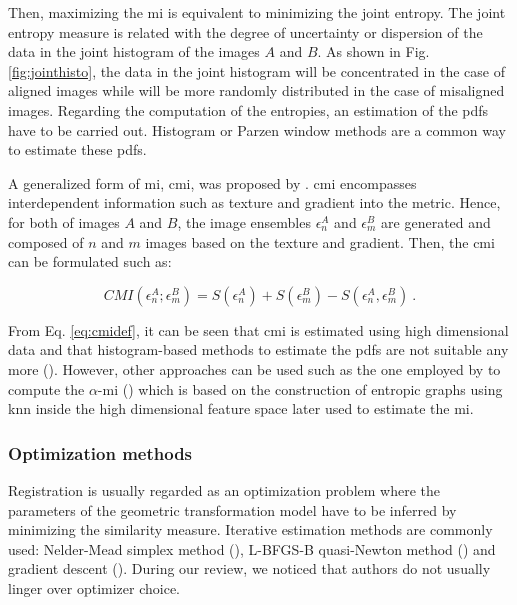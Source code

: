 Then, maximizing the \ac{mi} is equivalent to minimizing the joint entropy. The joint entropy measure is related with the degree of uncertainty or dispersion of the data in the joint histogram of the images $A$ and $B$. As shown in Fig. \ref{fig:jointhisto}, the data in the joint histogram will be concentrated in the case of aligned images while will be more randomly distributed in the case of misaligned images. Regarding the computation of the entropies, an estimation of the \acp{pdf} have to be carried out. Histogram or Parzen window methods are a common way to estimate these \acp{pdf}.

A generalized form of \ac{mi}, \ac{cmi}, was proposed by \cite{Chappelow2011}. \ac{cmi} encompasses interdependent information such as texture and gradient into the metric. Hence, for both of images $A$ and $B$, the image ensembles $\epsilon^{A}_n$ and $\epsilon^{B}_m$ are generated and composed of $n$ and $m$ images based on the texture and gradient. Then, the \ac{cmi} can be formulated such as:

\begin{equation}
	CMI(\epsilon^{A}_n;\epsilon^{B}_m) = S(\epsilon^{A}_n) + S(\epsilon^{B}_m) - S(\epsilon^{A}_n,\epsilon^{B}_m) \ .
	\label{eq:cmidef}
\end{equation}

From Eq. \eqref{eq:cmidef}, it can be seen that \ac{cmi} is estimated using high dimensional data and that histogram-based methods to estimate the \acp{pdf} are not suitable any more (\cite{Chappelow2011}). However, other approaches can be used such as the one employed by \cite{Staring2009} to compute the $\alpha$-\ac{mi} (\cite{Hero2002}) which is based on the construction of entropic graphs using \ac{knn} inside the high dimensional feature space later used to estimate the \ac{mi}.

\subsubsection{Optimization methods}\label{subsubsec:optmea}

Registration is usually regarded as an optimization problem where the parameters of the geometric transformation model have to be inferred by minimizing the similarity measure. Iterative estimation methods are commonly used: Nelder-Mead simplex method (\cite{Nelder1965}), L-BFGS-B quasi-Newton method (\cite{Byrd1995}) and gradient descent (\cite{Viola1997}). During our review, we noticed that authors do not usually linger over optimizer choice.

